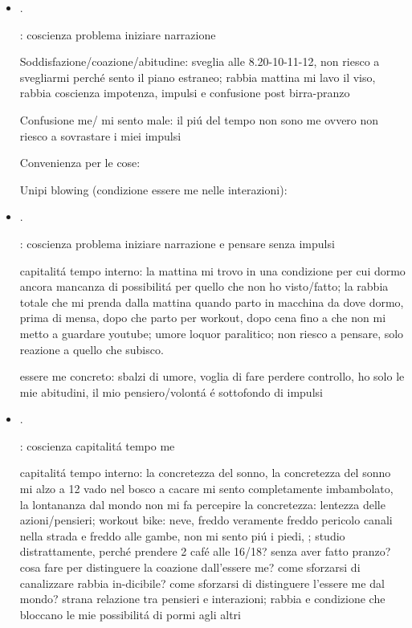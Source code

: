 \begin{itemize}
Convenienza per le cose: telefono casa (relazione padre ''insignificante'', madre ''indeciso'')

Unipi blowing (condizione essere me nelle interazioni):

\item {}.

: coscienza problema iniziare narrazione

Soddisfazione/coazione/abitudine: sveglia alle 8.20-10-11-12, non riesco a svegliarmi perch\'e sento il piano estraneo; rabbia mattina mi lavo il viso, rabbia coscienza impotenza, impulsi e confusione post birra-pranzo

Confusione me/ mi sento male: il pi\'u del tempo non sono me ovvero non riesco a sovrastare i miei impulsi

Convenienza per le cose:

Unipi blowing (condizione essere me nelle interazioni):

\item {}.

: coscienza problema iniziare narrazione e pensare senza impulsi


capitalit\'a tempo interno: la mattina mi trovo in una condizione per cui dormo ancora mancanza di possibilit\'a per quello che non ho visto/fatto; la rabbia totale che mi prenda dalla mattina quando parto in macchina da dove dormo, prima di mensa, dopo che parto per workout, dopo cena fino a che non mi metto a guardare youtube; umore loquor paralitico; non riesco a pensare, solo reazione a quello che subisco.

essere me concreto: sbalzi di umore, voglia di fare perdere controllo, ho solo le mie abitudini, il mio pensiero/volont\'a \'e sottofondo di impulsi

\item {}.

: coscienza capitalit\'a tempo me

capitalit\'a tempo interno: la concretezza del sonno, la concretezza del sonno mi alzo a 12 vado nel bosco a cacare mi sento completamente imbambolato, la lontananza dal mondo non mi fa percepire la concretezza: lentezza delle azioni/pensieri; workout bike: neve, freddo veramente freddo pericolo canali nella strada e freddo alle gambe, non mi sento pi\'u i piedi, ; studio distrattamente, perch\'e prendere 2 caf\'e alle 16/18? senza aver fatto pranzo? cosa fare per distinguere la coazione dall'essere me? come sforzarsi di canalizzare rabbia in-dicibile? come sforzarsi di distinguere l'essere me dal mondo? strana relazione tra pensieri e interazioni; rabbia e condizione che bloccano le mie possibilit\'a di pormi agli altri


\end{itemize}
